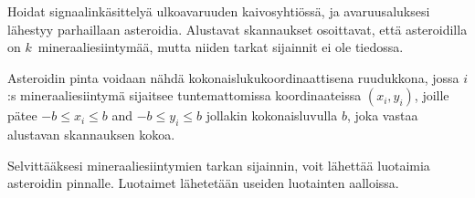 

\noindent

Hoidat signaalinkäsittelyä ulkoavaruuden kaivosyhtiössä, ja avaruusaluksesi lähestyy parhaillaan asteroidia.
Alustavat skannaukset osoittavat, että asteroidilla on $k$~mineraaliesiintymää, mutta niiden tarkat sijainnit ei ole tiedossa.

\medskip


Asteroidin pinta voidaan nähdä kokonaislukukoordinaattisena ruudukkona, jossa
$i$:s mineraaliesiintymä sijaitsee tuntemattomissa koordinaateissa $(x_i, y_i)$, joille pätee 
$-b \le x_i \le b$ and $-b\le y_i \le b$ %
jollakin kokonaisluvulla $b$, joka vastaa alustavan skannauksen kokoa.


Selvittääksesi mineraaliesiintymien tarkan sijainnin, voit lähettää luotaimia asteroidin pinnalle.
Luotaimet lähetetään useiden luotainten aalloissa.


